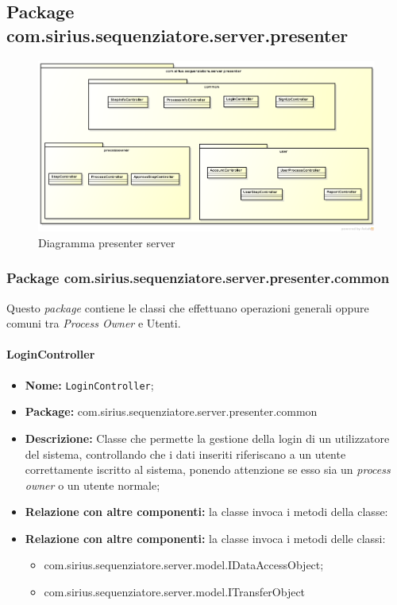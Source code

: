 \subsection{Package com.sirius.sequenziatore.server.presenter}
\begin{figure}[H] \centering \includegraphics[width=%
\textwidth]
{./pack/ClassiServerSoloPresenter.png} \caption{Diagramma presenter server}
\end{figure}
\subsubsection{Package com.sirius.sequenziatore.server.presenter.common}
Questo \textit{package} contiene le classi che effettuano operazioni generali oppure comuni tra \textit{Process Owner} e Utenti.
\paragraph{LoginController}
	\begin{itemize}
		\item \textbf{Nome:} \texttt{LoginController};
		\item \textbf{Package:} com.sirius.sequenziatore.server.presenter.common
		\item \textbf{Descrizione:} Classe che permette la gestione della login di un utilizzatore del sistema, controllando che i dati inseriti riferiscano a un utente correttamente iscritto al sistema, ponendo attenzione se esso sia un \textit{process owner} o un utente normale;
		\item \textbf{Relazione con altre componenti:} la classe invoca i metodi della classe:
		\item \textbf{Relazione con altre componenti:} la classe invoca i metodi delle classi:
		\begin{itemize}
			\item com.sirius.sequenziatore.server.model.IDataAccessObject;
			\item com.sirius.sequenziatore.server.model.ITransferObject
		\end{itemize}
	\end{itemize}
	
